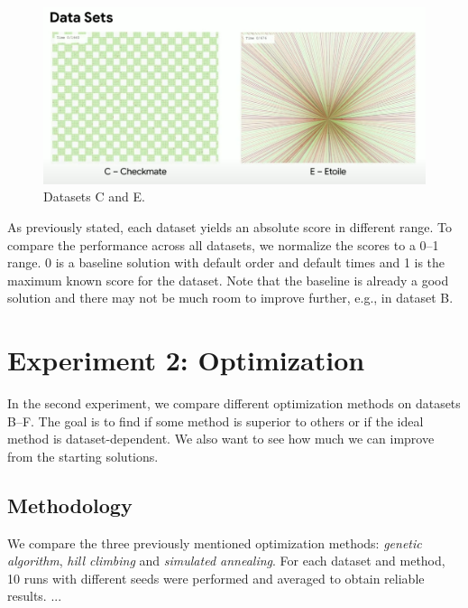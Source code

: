 \begin{figure}
    \centering
    \includegraphics[width=\linewidth]{img/screenshots/hashcode_datasets_c_e.png}
    \caption[Visualization of datasets C and E]{
        Datasets C and E\footnotemark.
        }
        \label{fig:hashcode_dataset_c_e}
    \end{figure}
    

\bigskip

As previously stated, each dataset yields an absolute score in different range. To compare the performance across all datasets, we normalize the scores to a 0--1 range. 0 is a baseline solution with default order and default times and 1 is the maximum known score for the dataset. Note that the baseline is already a good solution and there may not be much room to improve further, e.g., in dataset B.

\section{Experiment 2: Optimization}

In the second experiment, we compare different optimization methods on datasets B--F. The goal is to find if some method is superior to others or if the ideal method is dataset-dependent. We also want to see how much we can improve from the starting solutions.

\subsection*{Methodology}

We compare the three previously mentioned optimization methods: \textit{genetic algorithm}, \textit{hill climbing} and \textit{simulated annealing}. For each dataset and method, 10 runs with different seeds were performed and averaged to obtain reliable results. ...

